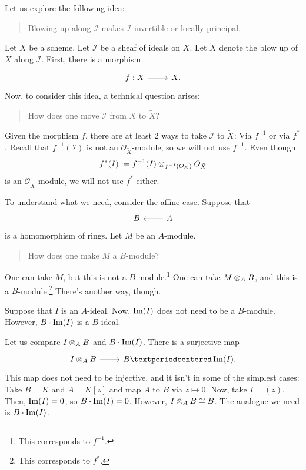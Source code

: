 \documentclass [11 pt, oneside] {article}
\begin{document}
Let us explore the following idea:
\begin{quote}
	\small Blowing up along $\mathscr{I}$ makes $\mathscr{I}$ invertible or locally principal.
\end{quote}
Let $X$ be a scheme. Let $\mathscr{I}$ be a sheaf of ideals on $X$. Let $\tilde X$ denote the blow up of $X$ along $\mathscr{I}$. 
First, there is a morphism
\[
\begin{tikzcd}
	f:\tilde X \ar[r]& X.
\end{tikzcd}
\]
Now, to consider this idea, a technical question arises:
\begin{quote}
	\small How does one move $\mathscr{I}$ from $X$ to $\tilde X$?
\end{quote}
Given the morphism $f$, there are at least $2$ ways to take $\mathscr{I}$ to $\tilde X$: Via $f^{-1}$ or via $f^*$. Recall that $f^{-1}(\mathscr{I})$ is not an $\mathscr{O}_{\tilde X}$-module, so we will not use $f^{-1}$. Even though
\begin{align*}
	f^*(\relax{I}) := f^{-1}(\relax{I})\otimes_{f^{-1}(\relax{O}_X)} \relax{O}_{\tilde X}
\end{align*}
is an $\mathscr{O}_{\tilde X}$-module, we will not use $f^*$ either.

To understand what we need, consider the affine case. Suppose that
\[
\begin{tikzcd}
	B&A\ar[l]
\end{tikzcd}
\]
is a homomorphism of rings. Let $M$ be an $A$-module.
\begin{quote}
	\small How does one make $M$ a $B$-module?
\end{quote}
One can take $M$, but this is not a $B$-module.\footnote{This corresponds to $f^{-1}$.} One can take $M\otimes_A B$, and this is a $B$-module.\footnote{This corresponds to $f^*$.} There's another way, though.

Suppose that $I$ is an $A$-ideal. Now, $\operatorname{Im}(I)$ does not need to be a $B$-module. However, $B\cdot\operatorname{Im}(I)$ is a $B$-ideal. 

Let us compare $I\otimes_A B$ and $B\cdot \operatorname{Im}(I)$.
There is a surjective map
\[
\begin{tikzcd}
	 I\tensor_A B \ar[r] & B· \Img(I).
\end{tikzcd}
\]
This map does not need to be injective, and it isn't in some of the simplest cases: Take $B= K$ and $A = K[z]$ and map $A$ to $B$ via $z\longmapsto 0$.
Now, take $I = (z)$. Then, $\operatorname{Im}(I)=0$, so $B\cdot \operatorname{Im}(I)=0$.
However, $I\otimes_A B \cong B$. 
The analogue we need is $B\cdot \operatorname{Im}(I)$.
\end{document}
